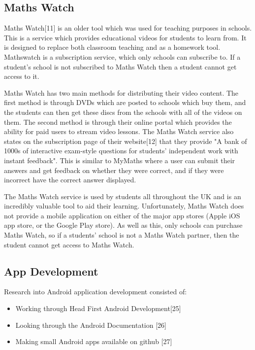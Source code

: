 \documentclass{article}
\begin{document}
\subsection{Maths Watch}

Maths Watch[11] is an older tool which was used for teaching purposes in schools. This is a service which provides educational videos for students to learn from. It is designed to replace both classroom teaching and as a homework tool. Mathswatch is a subscription service, which only schools can subscribe to. If a student's school is not subscribed to Maths Watch then a student cannot get access to it. \par

Maths Watch has two main methods for distributing their video content. The first method is through DVDs which are posted to schools which buy them, and the students can then get these discs from the schools with all of the videos on them. The second method is through their online portal which provides the ability for paid users to stream video lessons. The Maths Watch service also states on the subscription page of their website[12] that they provide "A bank of 1000s of interactive exam-style questions for students' independent work with instant feedback". This is similar to MyMaths where a user can submit their answers and get feedback on whether they were correct, and if they were incorrect have the correct answer displayed. \par

The Maths Watch service is used by students all throughout the UK and is an incredibly valuable tool to aid their learning. Unfortunately, Maths Watch does not provide a mobile application on either of the major app stores (Apple iOS app store, or the Google Play store). As well as this, only schools can purchase Maths Watch, so if a students' school is not a Maths Watch partner, then the student cannot get access to Maths Watch. \par

\subsection{App Development}

Research into Android application development consisted of: 

\begin{itemize}
	\item Working through Head First Android Development[25]
	\item Looking through the Android Documentation [26]
	\item Making small Android apps available on github [27]
\end{itemize}
\end{document}
